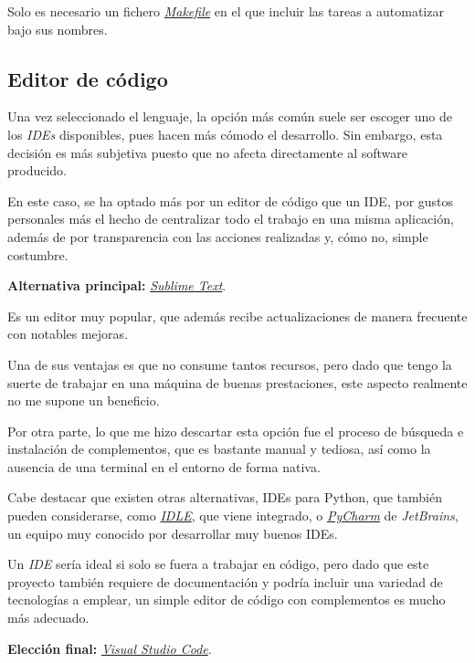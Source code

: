 Solo es necesario un fichero \href{https://github.com/Anglepi/My-Many-Reads/blob/main/Makefile}{\textit{Makefile}} en el que incluir las tareas a automatizar bajo sus nombres.

\subsection{Editor de código}
\label{Editor de código}

Una vez seleccionado el lenguaje, la opción más común suele ser escoger uno de los \textit{IDEs} disponibles, pues hacen más cómodo el desarrollo. Sin embargo, esta decisión es más subjetiva puesto que no afecta directamente al software producido.

En este caso, se ha optado más por un editor de código que un IDE, por gustos personales más el hecho de centralizar todo el trabajo en una misma aplicación, además de por transparencia con las acciones realizadas y, cómo no, simple costumbre.

\textbf{Alternativa principal:} \href{https://www.sublimetext.com/}{\textit{Sublime Text}}.

Es un editor muy popular, que además recibe actualizaciones de manera frecuente con notables mejoras.

Una de sus ventajas es que no consume tantos recursos, pero dado que tengo la suerte de trabajar en una máquina de buenas prestaciones, este aspecto realmente no me supone un beneficio.

Por otra parte, lo que me hizo descartar esta opción fue el proceso de búsqueda e instalación de complementos, que es bastante manual y tediosa, así como la ausencia de una terminal en el entorno de forma nativa.

Cabe destacar que existen otras alternativas, IDEs para Python, que también pueden considerarse, como \href{https://docs.python.org/3/library/idle.html}{\textit{IDLE}}, que viene integrado, o \href{https://www.jetbrains.com/es-es/pycharm/}{\textit{PyCharm}} de \textit{JetBrains}, un equipo muy conocido por desarrollar muy buenos IDEs.

Un \textit{IDE} sería ideal si solo se fuera a trabajar en código, pero dado que este proyecto también requiere de documentación y podría incluir una variedad de tecnologías a emplear, un simple editor de código con complementos es mucho más adecuado.

\textbf{Elección final:} \href{https://code.visualstudio.com/}{\textit{Visual Studio Code}}.


